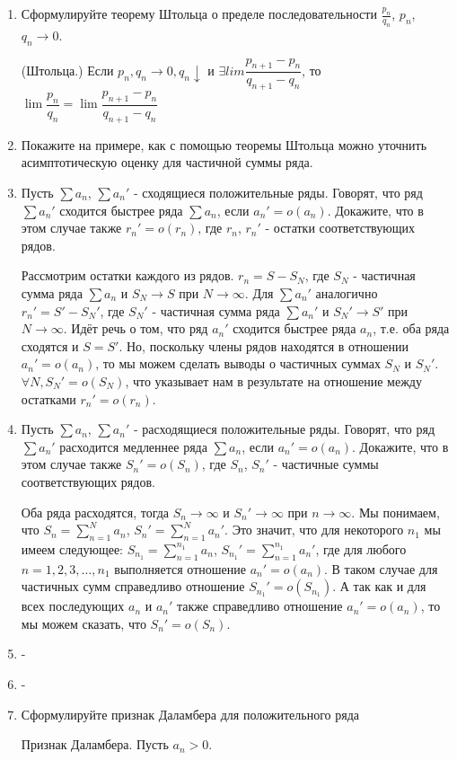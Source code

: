 \documentclass[a4paper]{article}
\begin{document}
\begin{enumerate}
        \item Сформулируйте теорему Штольца о пределе последовательности $\frac{p_n}{q_n}$, $p_n$, $q_n \to 0$.
        \begin{theorem}
            (Штольца.) Если $p_n, q_n \to 0, q_n \downarrow$ и $\exists lim \dfrac{p_{n + 1} - p_n}{q_{n + 1} - q_n}$, то
            $\lim \dfrac{p_n}{q_n} = \lim \dfrac{p_{n + 1} - p_n}{q_{n + 1} - q_n}$
        \end{theorem}
        \item Покажите на примере, как с помощью теоремы Штольца можно уточнить асимптотическую оценку для частичной суммы ряда.
        \item Пусть $\sum a_n$, $\sum a_n'$ - сходящиеся положительные ряды. Говорят, что ряд $\sum a_n'$ сходится быстрее ряда $\sum a_n$, если $a_n' = o(a_n)$. Докажите, что в этом случае также $r_n' = o(r_n)$, где $r_n$, $r_n'$ - остатки соответствующих рядов.
        
        Рассмотрим остатки каждого из рядов. $r_n = S - S_N$, где $S_N$ - частичная сумма ряда $\sum a_n$ и $S_N \rightarrow S$ при $N \rightarrow \infty$. Для $\sum a_n'$ аналогично $r_n' = S' - S_N'$, где $S_N'$ - частичная сумма ряда $\sum a_n'$ и $S_N' \rightarrow S'$ при $N \rightarrow \infty$. Идёт речь о том, что ряд $a_n'$ сходится быстрее ряда $a_n$, т.е. оба ряда сходятся и $S = S'$. Но, поскольку члены рядов находятся в отношении $a_n' = o(a_n)$, то мы можем сделать выводы о частичных суммах $S_N$ и $S_N'$. $\forall N, S_N' = o(S_N)$, что указывает нам в результате на отношение между остатками $r_n' = o(r_n)$.
        \item Пусть $\sum a_n$, $\sum a_n'$ - расходящиеся положительные ряды. Говорят, что ряд $\sum a_n'$ расходится медленнее ряда $\sum a_n$, если $a_n' = o(a_n)$. Докажите, что в этом случае также $S_n' = o(S_n)$, где $S_n$, $S_n'$ - частичные суммы соответствующих рядов.
        
        Оба ряда расходятся, тогда $S_n \rightarrow \infty$ и $S_n' \rightarrow \infty$ при $n \rightarrow \infty$. Мы понимаем, что $S_n = \sum_{n = 1}^{N} a_n$, $S_n' = \sum_{n = 1}^{N} a_n'$. Это значит, что для некоторого $n_1$ мы имеем следующее: $S_{n_1} = \sum_{n = 1}^{n_1} a_n$, $S_{n_1}' = \sum_{n = 1}^{n_1} a_n'$, где для любого $n = 1, 2, 3, \dots, n_1$ выполняется отношение $a_n' = o(a_n)$. В таком случае для частичных сумм справедливо отношение $S_{n_1}' = o(S_{n_1})$. А так как и для всех последующих $a_n$ и $a_n'$ также справедливо отношение $a_n' = o(a_n)$, то мы можем сказать, что $S_n' = o(S_n)$.
        \item -
        \item -
        \item Сформулируйте признак Даламбера для положительного ряда
        \begin{theorem}
            Признак Даламбера. Пусть $a_n > 0$.
            

\end{theorem}
\end{enumerate}
\end{document}
